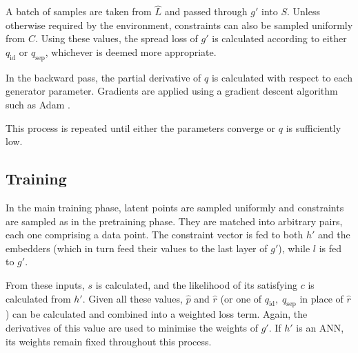 \documentclass[../../main.tex]{subfiles}
\begin{document}
A batch of samples are taken from $\hat{L}$ and passed through $g'$ into $S$.
Unless otherwise required by the environment, constraints can also be sampled uniformly from $C$.
Using these values, the spread loss of $g'$ is calculated according to either $q_\text{id}$ or $q_\text{sep}$, whichever is deemed more appropriate.

In the backward pass, the partial derivative of $q$ is calculated with respect to each generator parameter.
Gradients are applied using a gradient descent algorithm such as Adam \cite{kingma17}.

This process is repeated until either the parameters converge or $q$ is sufficiently low.

\subsection{Training} \label{subsection:training}

In the main training phase, latent points are sampled uniformly and constraints are sampled as in the pretraining phase.
They are matched into arbitrary pairs, each one comprising a data point.
The constraint vector is fed to both $h'$ and the embedders (which in turn feed their values to the last layer of $g'$), while $l$ is fed to $g'$.

From these inputs, $s$ is calculated, and the likelihood of its satisfying $c$ is calculated from $h'$.
Given all these values, $\hat{p}$ and $\hat{r}$ (or one of $q_\text{id},\;q_\text{sep}$ in place of $\hat{r}$) can be calculated and combined into a weighted loss term.
Again, the derivatives of this value are used to minimise the weights of $g'$.
If $h'$ is an ANN, its weights remain fixed throughout this process.
\end{document}
